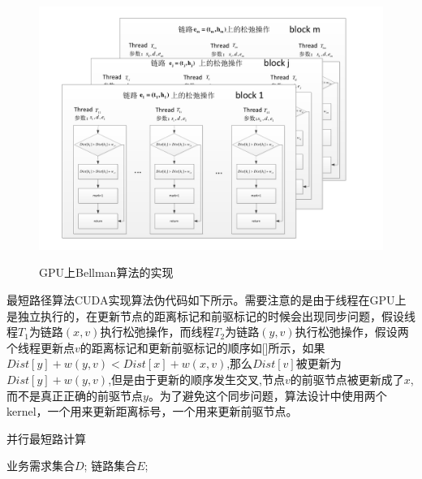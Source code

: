 \begin{figure}
\setlength{\belowcaptionskip}{-0.5cm}
  \begin{center}
    {\includegraphics[width=1 \textwidth]{figures/GPUimpl.pdf}}
    \end{center}
  \caption{{\footnotesize{GPU上Bellman算法的实现}}}
  \label{ParFramework}
\end{figure}
  最短路径算法CUDA实现算法伪代码如下所示。需要注意的是由于线程在GPU上是独立执行的，在更新节点的距离标记和前驱标记的时候会出现同步问题，假设线程$T_1$为链路$(x,v)$执行松弛操作，而线程$T_2$为链路$(y,v)$执行松弛操作，假设两个线程更新点$v$的距离标记和更新前驱标记的顺序如[]所示，如果$Dist[y] + w(y, v) < Dist[x] +w(x, v)$,那么$Dist[v]$被更新为$Dist[y] + w(y, v)$,但是由于更新的顺序发生交叉,节点$v$的前驱节点被更新成了$x$,而不是真正正确的前驱节点$y$。为了避免这个同步问题，算法设计中使用两个kernel，一个用来更新距离标号，一个用来更新前驱节点。
\begin{algorithm}[t]
\begin{algorithmic}[1]
\caption{{并行最短路计算}}
\label{ParaSPC}
\Require
	 业务需求集合$D$;
      链路集合$E$;
\EndWhile
\end{algorithmic}
\end{algorithm}

